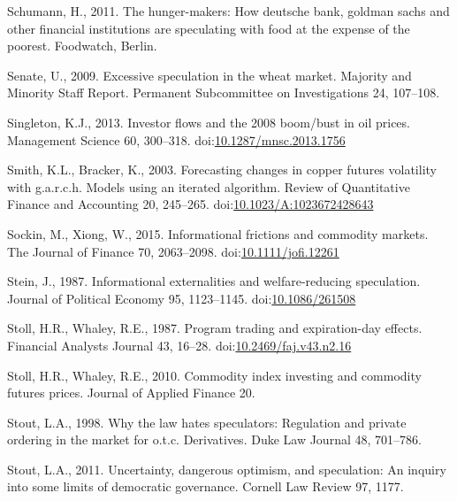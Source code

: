 \documentclass[]{elsarticle} %
\begin{document}
\leavevmode\hypertarget{ref-schumann_hunger_2011}{}%
Schumann, H., 2011. The hunger-makers: How deutsche bank, goldman sachs
and other financial institutions are speculating with food at the
expense of the poorest. Foodwatch, Berlin.

\leavevmode\hypertarget{ref-senate_excessive_2009}{}%
Senate, U., 2009. Excessive speculation in the wheat market. Majority
and Minority Staff Report. Permanent Subcommittee on Investigations 24,
107--108.

\leavevmode\hypertarget{ref-singleton_investor_2013}{}%
Singleton, K.J., 2013. Investor flows and the 2008 boom/bust in oil
prices. Management Science 60, 300--318.
doi:\href{https://doi.org/10.1287/mnsc.2013.1756}{10.1287/mnsc.2013.1756}

\leavevmode\hypertarget{ref-smith_forecasting_2003}{}%
Smith, K.L., Bracker, K., 2003. Forecasting changes in copper futures
volatility with g.a.r.c.h. Models using an iterated algorithm. Review of
Quantitative Finance and Accounting 20, 245--265.
doi:\href{https://doi.org/10.1023/A:1023672428643}{10.1023/A:1023672428643}

\leavevmode\hypertarget{ref-sockin_informational_2015}{}%
Sockin, M., Xiong, W., 2015. Informational frictions and commodity
markets. The Journal of Finance 70, 2063--2098.
doi:\href{https://doi.org/10.1111/jofi.12261}{10.1111/jofi.12261}

\leavevmode\hypertarget{ref-stein_informational_1987}{}%
Stein, J., 1987. Informational externalities and welfare-reducing
speculation. Journal of Political Economy 95, 1123--1145.
doi:\href{https://doi.org/10.1086/261508}{10.1086/261508}

\leavevmode\hypertarget{ref-stoll_program_1987}{}%
Stoll, H.R., Whaley, R.E., 1987. Program trading and expiration-day
effects. Financial Analysts Journal 43, 16--28.
doi:\href{https://doi.org/10.2469/faj.v43.n2.16}{10.2469/faj.v43.n2.16}

\leavevmode\hypertarget{ref-stoll_commodity_2010}{}%
Stoll, H.R., Whaley, R.E., 2010. Commodity index investing and commodity
futures prices. Journal of Applied Finance 20.

\leavevmode\hypertarget{ref-stout_why_1998}{}%
Stout, L.A., 1998. Why the law hates speculators: Regulation and private
ordering in the market for o.t.c. Derivatives. Duke Law Journal 48,
701--786.

\leavevmode\hypertarget{ref-stout_uncertainty_2011}{}%
Stout, L.A., 2011. Uncertainty, dangerous optimism, and speculation: An
inquiry into some limits of democratic governance. Cornell Law Review
97, 1177.
\end{document}
